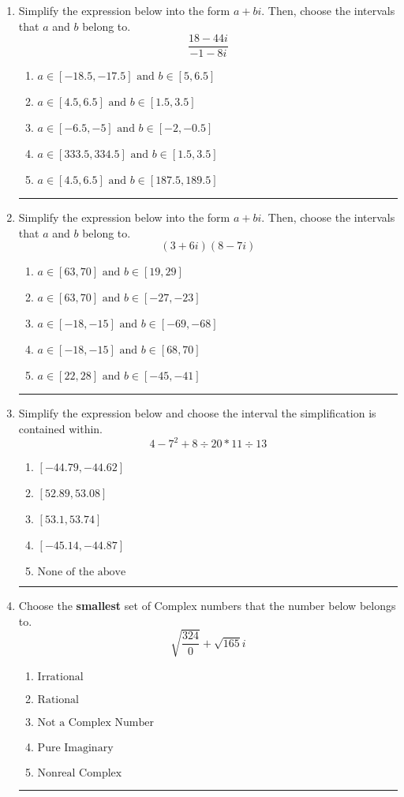 \documentclass[14pt]{extbook}
\newcommand{\litem}[1]{\item#1\hspace*{-1cm}\rule{\textwidth}{0.4pt}}
\begin{document}
\begin{enumerate}

\litem{
Simplify the expression below into the form $a+bi$. Then, choose the intervals that $a$ and $b$ belong to.\[ \frac{18 - 44 i}{-1 - 8 i} \]\begin{enumerate}[label=\Alph*.]
\item \( a \in [-18.5, -17.5] \text{ and } b \in [5, 6.5] \)
\item \( a \in [4.5, 6.5] \text{ and } b \in [1.5, 3.5] \)
\item \( a \in [-6.5, -5] \text{ and } b \in [-2, -0.5] \)
\item \( a \in [333.5, 334.5] \text{ and } b \in [1.5, 3.5] \)
\item \( a \in [4.5, 6.5] \text{ and } b \in [187.5, 189.5] \)

\end{enumerate} }
\litem{
Simplify the expression below into the form $a+bi$. Then, choose the intervals that $a$ and $b$ belong to.\[ (3 + 6 i)(8 - 7 i) \]\begin{enumerate}[label=\Alph*.]
\item \( a \in [63, 70] \text{ and } b \in [19, 29] \)
\item \( a \in [63, 70] \text{ and } b \in [-27, -23] \)
\item \( a \in [-18, -15] \text{ and } b \in [-69, -68] \)
\item \( a \in [-18, -15] \text{ and } b \in [68, 70] \)
\item \( a \in [22, 28] \text{ and } b \in [-45, -41] \)

\end{enumerate} }
\litem{
Simplify the expression below and choose the interval the simplification is contained within.\[ 4 - 7^2 + 8 \div 20 * 11 \div 13 \]\begin{enumerate}[label=\Alph*.]
\item \( [-44.79, -44.62] \)
\item \( [52.89, 53.08] \)
\item \( [53.1, 53.74] \)
\item \( [-45.14, -44.87] \)
\item \( \text{None of the above} \)

\end{enumerate} }
\litem{
Choose the \textbf{smallest} set of Complex numbers that the number below belongs to.\[ \sqrt{\frac{324}{0}}+\sqrt{165} i \]\begin{enumerate}[label=\Alph*.]
\item \( \text{Irrational} \)
\item \( \text{Rational} \)
\item \( \text{Not a Complex Number} \)
\item \( \text{Pure Imaginary} \)
\item \( \text{Nonreal Complex} \)


\end{enumerate}}
\end{enumerate}
\end{document}
